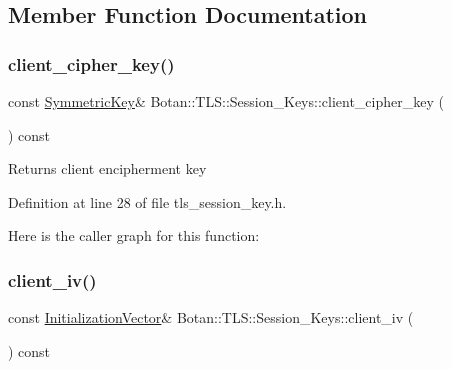 \subsection{Member Function Documentation}
\mbox{\label{class_botan_1_1_t_l_s_1_1_session___keys_abcf288cea8831273fc95a9744e70d68b}} 
\subsubsection{\texorpdfstring{client\+\_\+cipher\+\_\+key()}{client\_cipher\_key()}}
{\footnotesize\ttfamily const \mbox{\hyperlink{namespace_botan_a89cf6c3513428f524454d01830221a88}{Symmetric\+Key}}\& Botan\+::\+T\+L\+S\+::\+Session\+\_\+\+Keys\+::client\+\_\+cipher\+\_\+key (\begin{DoxyParamCaption}{ }\end{DoxyParamCaption}) const\hspace{0.3cm}{\ttfamily [inline]}}

\begin{DoxyReturn}{Returns}
client encipherment key 
\end{DoxyReturn}


Definition at line 28 of file tls\+\_\+session\+\_\+key.\+h.

Here is the caller graph for this function\+:
\mbox{\label{class_botan_1_1_t_l_s_1_1_session___keys_ae948da8c53c2303521b058e3a5a4c879}} 
\subsubsection{\texorpdfstring{client\+\_\+iv()}{client\_iv()}}
{\footnotesize\ttfamily const \mbox{\hyperlink{namespace_botan_a2fbf5195ffe701adcabb1f8c41bfc557}{Initialization\+Vector}}\& Botan\+::\+T\+L\+S\+::\+Session\+\_\+\+Keys\+::client\+\_\+iv (\begin{DoxyParamCaption}{ }\end{DoxyParamCaption}) const\hspace{0.3cm}{\ttfamily [inline]}}

